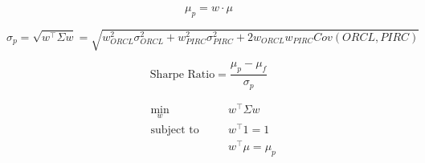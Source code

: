\documentclass[12pt,a4paper]{report}
\begin{document}
\begin{equation}
	\label{eq:expected-return}
	\mu_p=w\cdot\mu
\end{equation}

\begin{equation}
	\label{eq:portfolio-variance}
	\sigma_{p} = \sqrt{w^\top \Sigma w} = \sqrt{w_{ORCL}^2 \sigma_{ORCL}^2 + w_{PIRC}^2 \sigma_{PIRC}^2 + 2 w_{ORCL} w_{PIRC}Cov(ORCL, PIRC)}
\end{equation}

\begin{equation}
	\label{eq:sharpe-ratio}
	\text{Sharpe Ratio} = \frac{\mu_{p} - \mu_{f}}{\sigma_{p}}
\end{equation}

\begin{equation}
	\label{eq:constrained-optimization-problem}
	\begin{aligned}& \min_{w} \quad && w^\top \Sigma w \\ & \text{subject to} \quad && w^\top 1 = 1 \\ & && w ^\top \mu = \mu_{p} \end{aligned}
\end{equation}

\clearpage
\nocite{*}


\end{document}
